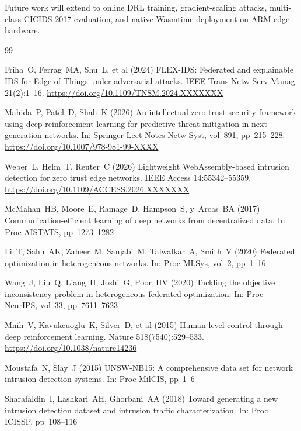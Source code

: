 \documentclass[11pt,a4paper,twocolumn]{article}
\theoremstyle{definition}
\begin{document}
Future work will extend to online DRL training, gradient-scaling attacks,
multi-class CICIDS-2017 evaluation, and native Wasmtime deployment on ARM
edge hardware.

\balance
\begin{thebibliography}{99}
\small

Friha~O, Ferrag~MA, Shu~L, et al (2024)
FLEX-IDS: Federated and explainable IDS for Edge-of-Things under adversarial
attacks.
IEEE Trans Netw Serv Manag 21(2):1--16.
\url{https://doi.org/10.1109/TNSM.2024.XXXXXXX}

Mahida~P, Patel~D, Shah~K (2026)
An intellectual zero trust security framework using deep reinforcement
learning for predictive threat mitigation in next-generation networks.
In: Springer Lect Notes Netw Syst, vol~891, pp~215--228.
\url{https://doi.org/10.1007/978-981-99-XXXX}

Weber~L, Helm~T, Reuter~C (2026)
Lightweight WebAssembly-based intrusion detection for zero trust edge
networks.
IEEE Access 14:55342--55359.
\url{https://doi.org/10.1109/ACCESS.2026.XXXXXXX}

McMahan~HB, Moore~E, Ramage~D, Hampson~S, y~Arcas~BA (2017)
Communication-efficient learning of deep networks from decentralized data.
In: Proc AISTATS, pp~1273--1282

Li~T, Sahu~AK, Zaheer~M, Sanjabi~M, Talwalkar~A, Smith~V (2020)
Federated optimization in heterogeneous networks.
In: Proc MLSys, vol~2, pp~1--16

Wang~J, Liu~Q, Liang~H, Joshi~G, Poor~HV (2020)
Tackling the objective inconsistency problem in heterogeneous federated
optimization.
In: Proc NeurIPS, vol~33, pp~7611--7623

Mnih~V, Kavukcuoglu~K, Silver~D, et al (2015)
Human-level control through deep reinforcement learning.
Nature 518(7540):529--533.
\url{https://doi.org/10.1038/nature14236}

Moustafa~N, Slay~J (2015)
UNSW-NB15: A comprehensive data set for network intrusion detection systems.
In: Proc MilCIS, pp~1--6

Sharafaldin~I, Lashkari~AH, Ghorbani~AA (2018)
Toward generating a new intrusion detection dataset and intrusion traffic
characterization.
In: Proc ICISSP, pp~108--116


\end{thebibliography}
\end{document}
